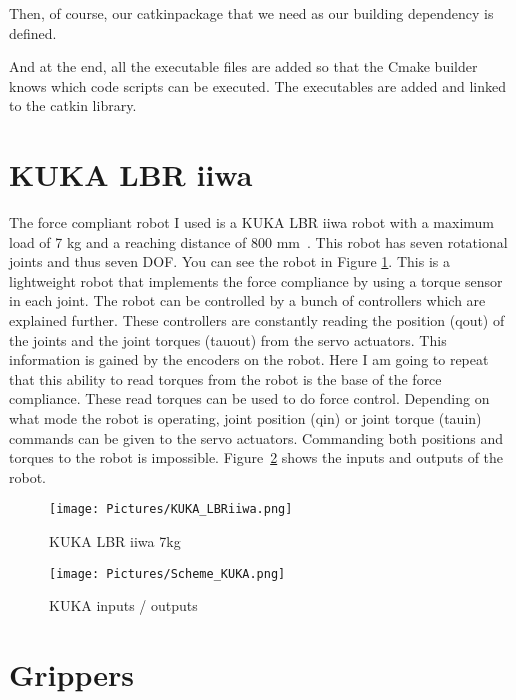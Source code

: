 \documentclass[11pt,a4paper]{report}
\begin{document}
Then, of course, our catkin\textunderscore package that we need as our building dependency is defined.

And at the end, all the executable files are added so that the Cmake builder knows which code scripts can be executed. The executables are added and linked to the catkin library.

\section{KUKA LBR iiwa}
The force compliant robot I used is a KUKA LBR iiwa robot with a maximum load of 7 kg and a reaching distance of 800 mm~\cite{KUKALBRiiwa}. This robot has seven rotational joints and thus seven DOF. You can see the robot in Figure \ref{fig:KUKALBRiiwa}. This is a lightweight robot that implements the force compliance by using a torque sensor in each joint. The robot can be controlled by a bunch of controllers which are explained further. These controllers are constantly reading the position (q\textunderscore out) of the joints and the joint torques (tau\textunderscore out) from the servo actuators. This information is gained by the encoders on the robot. Here I am going to repeat that this ability to read torques from the robot is the base of the force compliance. These read torques can be used to do force control. Depending on what mode the robot is operating, joint position (q\textunderscore in) or joint torque (tau\textunderscore in) commands can be given to the servo actuators. Commanding both positions and torques to the robot is impossible. Figure~\ref{fig:KUKAInputsOutputs} shows the inputs and outputs of the robot.

\begin{figure}[!ht]
	\centering
	\texttt{[image: Pictures/KUKA\_LBRiiwa.png]}
	\caption{KUKA LBR iiwa 7kg}
	\label{fig:KUKALBRiiwa}
\end{figure}

\begin{figure}[!ht]
	\centering
	\texttt{[image: Pictures/Scheme\_KUKA.png]}
	\caption{KUKA inputs / outputs}
	\label{fig:KUKAInputsOutputs}
\end{figure}

\section{Grippers}
\end{document}
